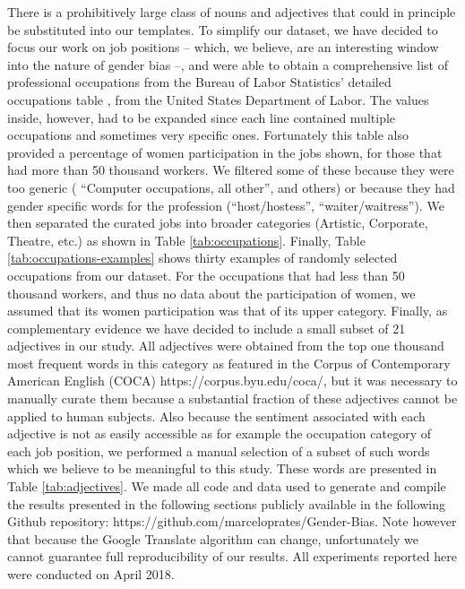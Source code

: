 \documentclass[twoside,11pt]{article}
\begin{document}
There is a prohibitively large class of nouns and adjectives that could in principle be substituted into our templates. To simplify our dataset, we have decided to focus our work on job positions -- which, we believe, are an interesting window into the nature of gender bias --, and were able to obtain a comprehensive list of professional occupations from the Bureau of Labor Statistics' detailed occupations table \cite{BLS2017}, from the United States Department of Labor. The values inside, however, had to be expanded since each line contained multiple occupations and sometimes very specific ones. Fortunately this table also provided a percentage of women participation in the jobs shown, for those that had more than 50 thousand workers. We filtered some of these because they were too generic ( ``Computer occupations, all other'', and others) or because they had gender specific words for the profession (``host/hostess'', ``waiter/waitress''). We then separated the curated jobs into broader categories (Artistic, Corporate, Theatre, etc.) as shown in Table \ref{tab:occupations}. Finally, Table \ref{tab:occupations-examples} shows thirty examples of randomly selected occupations from our dataset. For the occupations that had less than 50 thousand workers, and thus no data about the participation of women, we assumed that its women participation was that of its upper category. Finally, as complementary evidence we have decided to include a small subset of 21 adjectives in our study. All adjectives were obtained from the top one thousand most frequent words in this category as featured in the Corpus of Contemporary American English (COCA) https://corpus.byu.edu/coca/, but it was necessary to manually curate them because a substantial fraction of these adjectives cannot be applied to human subjects. Also because the sentiment associated with each adjective is not as easily accessible as for example the occupation category of each job position, we performed a manual selection of a subset of such words which we believe to be meaningful to this study. These words are presented in Table \ref{tab:adjectives}. We made all code and data used to generate and compile the results presented in the following sections publicly available in the following Github repository: https://github.com/marceloprates/Gender-Bias. Note however that because the Google Translate algorithm can change, unfortunately we cannot guarantee full reproducibility of our results. All experiments reported here were conducted on April 2018.
\end{document}
